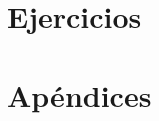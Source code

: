 \documentclass[10pt,fleqn,a4]{book}
\begin{document}








\part{Ejercicios}




\appendix

\part{Apéndices}




\end{document}
